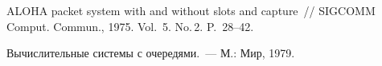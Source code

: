 \begin{multicols}{2}
{{\begin{thebibliography}{99}
  ALOHA packet system with and without slots and capture~// SIGCOMM Comput. Commun., 1975. Vol.~5. No.\,2. P.~28--42.
  
  \label{end\stat}

    Вычислительные системы с очередями.~--- М.: Мир, 1979.







  

 \end{thebibliography}
}
}

\end{multicols}